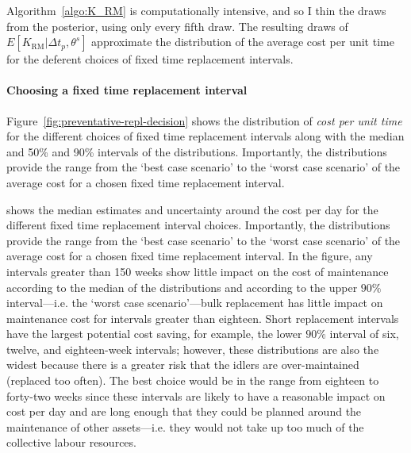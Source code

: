 Algorithm~\ref{algo:K_RM} is computationally intensive, and so I thin the draws from the posterior, using only every fifth draw. The resulting draws of $E[K_{\text{RM}}|\Delta t_p,\theta^s]$ approximate the distribution of the average cost per unit time for the deferent choices of fixed time replacement intervals.

\paragraph*{Choosing a fixed time replacement interval}

Figure~\ref{fig:preventative-repl-decision} shows the distribution of \textit{cost per unit time} for the different choices of fixed time replacement intervals along with the median and 50\% and 90\% intervals of the distributions. Importantly, the distributions provide the range from the `best case scenario' to the `worst case scenario' of the average cost for a chosen fixed time replacement interval. 

shows the median estimates and uncertainty around the cost per day for the different fixed time replacement interval choices. Importantly, the distributions provide the range from the `best case scenario' to the `worst case scenario' of the average cost for a chosen fixed time replacement interval. In the figure, any intervals greater than 150 weeks show little impact on the cost of maintenance according to the median of the distributions and according to the upper $90\%$ interval---i.e. the `worst case scenario'---bulk replacement has little impact on maintenance cost for intervals greater than eighteen. Short replacement intervals have the largest potential cost saving, for example, the lower $90\%$ interval of six, twelve, and eighteen-week intervals; however, these distributions are also the widest because there is a greater risk that the idlers are over-maintained (replaced too often). The best choice would be in the range from eighteen to forty-two weeks since these intervals are likely to have a reasonable impact on cost per day and are long enough that they could be planned around the maintenance of other assets---i.e. they would not take up too much of the collective labour resources.

